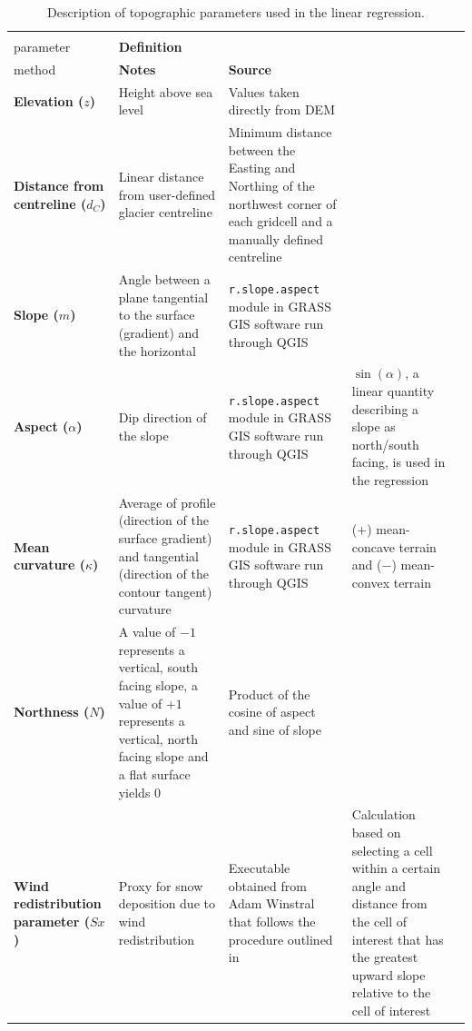 \documentclass{sfuthesis}
\begin{document}
\begin{landscape}
\begin{table}
\footnotesize
\begin{threeparttable}
\caption{Description of topographic parameters used in the linear regression.}
\label{tab:TopoParams}
\begin{tabularx}{22cm}{XXXXX}
\midrule
\textbf{\begin{tabular}[c]{@{}l@{}}Topographic\\ parameter\end{tabular}} & \textbf{Definition} & \textbf{\begin{tabular}[c]{@{}l@{}}Calculation \\ method\end{tabular}} & \textbf{Notes} & \textbf{Source} \\ \midrule
\textbf{Elevation ($z$)} & Height above sea level & Values taken directly from DEM &  &  \\ \midrule
\textbf{Distance from centreline ($d_C$)} & Linear distance from user-defined glacier centreline & Minimum distance between the Easting and Northing of the northwest corner of each gridcell and a manually defined centreline &  &  \\ \midrule
\textbf{Slope ($m$)} & Angle between a plane tangential to the surface (gradient) and the horizontal & \texttt{r.slope.aspect} module in GRASS GIS software run through QGIS &  & \cite{Mitavsova1993, Hofierka2009, Olaya2009} \\ \midrule
\textbf{Aspect ($\alpha$)} & Dip direction of the slope & \texttt{r.slope.aspect} module in GRASS GIS software run through QGIS & $\sin(\alpha)$, a linear quantity describing a slope as north/south facing, is used in the regression & \cite{Mitavsova1993, Hofierka2009, Olaya2009} \\ \midrule
\textbf{Mean curvature ($\kappa$)} & Average of profile (direction of the surface gradient) and tangential (direction of the contour tangent) curvature & \texttt{r.slope.aspect} module in GRASS GIS software run through QGIS & ($+$) mean-concave terrain and ($-$) mean-convex terrain & \cite{Mitavsova1993, Hofierka2009, Olaya2009} \\ \midrule
\textbf{Northness ($N$)} & A value of $-1$ represents a vertical, south facing slope, a value of $+1$ represents a vertical, north facing slope and a flat surface yields 0 & Product of the cosine of aspect and sine of slope &  & \citep{Molotch2005} \\ \midrule
\textbf{Wind redistribution parameter ($Sx$)} & Proxy for snow deposition due to wind redistribution & Executable obtained from Adam Winstral that follows the procedure outlined in \cite{Winstral2002} & Calculation based on selecting a cell within a certain angle and distance from the cell of interest that has the greatest upward slope relative to the cell of interest & \citep{Winstral2002}
\end{tabularx}
\end{threeparttable}
\end{table}
\end{landscape}
\end{document}
